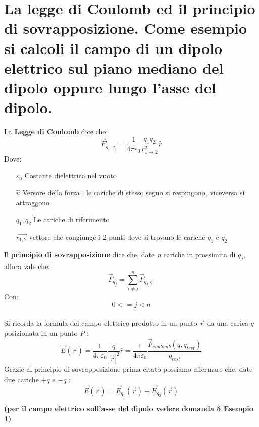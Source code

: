 \section{La legge di Coulomb ed il principio di sovrapposizione.
	Come esempio si calcoli il campo di un dipolo elettrico sul
	piano mediano del dipolo oppure lungo l'asse del dipolo.}
La \textbf{Legge di Coulomb} dice che:
\begin{equation}
  \vec{F}_{q_1, q_2} = \frac{1}{4 \pi \varepsilon_0} \frac{q_1 q_2}{r_{1 \rightarrow 2}^{2}}\hat{r}
\end{equation}
Dove:
\begin{itemize}
	\item[$ \varepsilon_0$] {Costante dielettrica nel vuoto}
	\item[$ \hat{u} $] {Versore della forza : le cariche di stesso segno si respingono, viceversa si attraggono}
	\item[$ q_1, q_2 $] {Le cariche di riferimento}
	\item[$ \vec{r_{1, 2}} $] {vettore che congiunge i 2 punti dove si trovano le cariche $ q_1 $ e $ q_2 $}
\end{itemize}
Il \textbf{principio di sovrapposizione} dice che, date \emph{n} cariche in prossimita di $ q_j $, allora vale che:
\begin{equation}
    \vec{F}_{q_j} = \sum_{i \neq j}^{n}{\vec{F}_{q_j, q_i}}
\end{equation}
Con:
$$ 0 <= j < n $$
\\
Si ricorda la formula del campo elettrico prodotto  in un punto $\vec{r}$ da una carica $q$ posizionata in un punto $P$ :
\begin{displaymath}
\vec{E}\left( \vec{r} \right) = 
\frac{1}{4 \pi \varepsilon_0} \frac{q}{|\vec{r}|^2} \hat{r} = 
\frac{1}{4 \pi \varepsilon_0} \frac{\vec{F}_{coulomb} (q, q_{test})}{q_{test}} 
\end{displaymath}
Grazie al principio di sovrapposizione prima citato possiamo affermare che, date due cariche $+q$ e $-q$ :
\begin{equation}
\vec{E}\left( \vec{r} \right) = 
\vec{E}_{q_1}\left( \vec{r} \right) + \vec{E}_{q_2}\left( \vec{r} \right)
\end{equation}

\begin{center}
    \textbf{(per il  campo elettrico sull'asse del dipolo vedere domanda 5 Esempio 1)}
\end{center}
